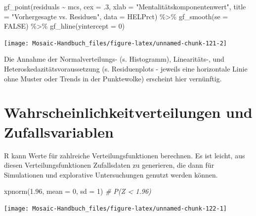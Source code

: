 \documentclass[
  ngerman,
]{scrbook}
\newenvironment{Shaded}{\begin{snugshade}}{\end{snugshade}}
\newcommand{\AttributeTok}[1]{\textcolor[rgb]{0.77,0.63,0.00}{#1}}
\newcommand{\CommentTok}[1]{\textcolor[rgb]{0.56,0.35,0.01}{\textit{#1}}}
\newcommand{\ConstantTok}[1]{\textcolor[rgb]{0.00,0.00,0.00}{#1}}
\newcommand{\DecValTok}[1]{\textcolor[rgb]{0.00,0.00,0.81}{#1}}
\newcommand{\FloatTok}[1]{\textcolor[rgb]{0.00,0.00,0.81}{#1}}
\newcommand{\FunctionTok}[1]{\textcolor[rgb]{0.00,0.00,0.00}{#1}}
\newcommand{\NormalTok}[1]{#1}
\newcommand{\SpecialCharTok}[1]{\textcolor[rgb]{0.00,0.00,0.00}{#1}}
\newcommand{\StringTok}[1]{\textcolor[rgb]{0.31,0.60,0.02}{#1}}
\begin{document}
\begin{Shaded}
\begin{Highlighting}[]
\FunctionTok{gf\_point}\NormalTok{(residuals }\SpecialCharTok{\textasciitilde{}}\NormalTok{ mcs, }\AttributeTok{cex =}\NormalTok{ .}\DecValTok{3}\NormalTok{, }\AttributeTok{xlab =} \StringTok{"Mentalitätskomponentenwert"}\NormalTok{,}
         \AttributeTok{title =} \StringTok{"Vorhergesagte vs. Residuen"}\NormalTok{, }\AttributeTok{data =}\NormalTok{ HELPrct) }\SpecialCharTok{\%\textgreater{}\%}
  \FunctionTok{gf\_smooth}\NormalTok{(}\AttributeTok{se =} \ConstantTok{FALSE}\NormalTok{) }\SpecialCharTok{\%\textgreater{}\%}
  \FunctionTok{gf\_hline}\NormalTok{(}\AttributeTok{yintercept =} \DecValTok{0}\NormalTok{)}
\end{Highlighting}
\end{Shaded}

\begin{center}\texttt{[image: Mosaic-Handbuch\_files/figure-latex/unnamed-chunk-121-2]} \end{center}

Die Annahme der Normalverteilungs- (s. Histogramm), Linearitäts-, und Heteroskedazitätsvoraussetzung (s. Residuenplots - jeweils eine horizontale Linie ohne Muster oder Trends in der Punktewolke) erscheint hier vernünftig.

\hypertarget{WkeitZuf}{%
\chapter{Wahrscheinlichkeitverteilungen und Zufallsvariablen}\label{WkeitZuf}}

\textsf{R} kann Werte für zahlreiche Verteilungsfunktionen berechnen. Es ist leicht, aus diesen Verteilungsfunktionen Zufallsdaten zu generieren, die dann für Simulationen und explorative Untersuchungen genutzt werden können.

\begin{Shaded}
\begin{Highlighting}[]
\FunctionTok{xpnorm}\NormalTok{(}\FloatTok{1.96}\NormalTok{, }\AttributeTok{mean =} \DecValTok{0}\NormalTok{, }\AttributeTok{sd =} \DecValTok{1}\NormalTok{) }\CommentTok{\# P(Z \textless{} 1.96)}
\end{Highlighting}
\end{Shaded}

\begin{center}\texttt{[image: Mosaic-Handbuch\_files/figure-latex/unnamed-chunk-122-1]} \end{center}
\end{document}

